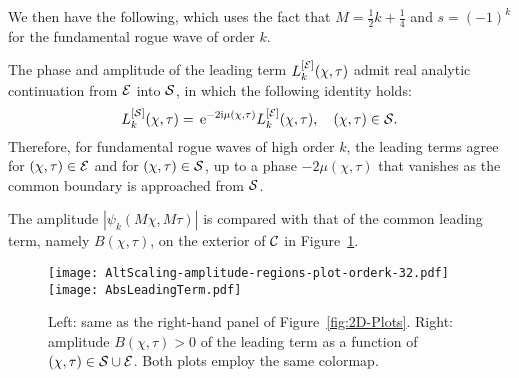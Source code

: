 We then have the following, which uses the fact that $M=\tfrac{1}{2}k+\tfrac{1}{4}$ and $s=(-1)^k$ for the fundamental rogue wave of order $k$.
\begin{corollary}
The phase and amplitude of the leading term $L_k^{[\mathcal{E}]}(\chi,\tau)$ admit real analytic continuation from $\mathcal{E}$ into $\mathcal{S}$, in which the following identity holds:
\begin{equation}
L_k^{[\mathcal{S}]}(\chi,\tau)=\,\mathrm{e}^{-2\mathrm{i}\mu(\chi,\tau)}L_k^{[\mathcal{E}]}(\chi,\tau),\quad (\chi,\tau)\in\mathcal{S}.
\end{equation}
Therefore, for fundamental rogue waves of high order $k$, the leading terms agree for $(\chi,\tau)\in\mathcal{E}$ and for $(\chi,\tau)\in\mathcal{S}$, up to a phase $-2\mu(\chi,\tau)$ that vanishes as the common boundary is approached from $\mathcal{S}$.
\label{cor:leading-term-match-shelves-exterior}
\end{corollary}
The amplitude $|\psi_k(M\chi,M\tau)|$ is compared with that of the common leading term, namely $B(\chi,\tau)$, on the exterior of $\mathcal{C}$ in Figure~\ref{fig:AbsLeadingTermShelves}.  
\begin{figure}[h]
\begin{center}
\phantom{!}\hfill\texttt{[image: AltScaling-amplitude-regions-plot-orderk-32.pdf]}\hfill%
\texttt{[image: AbsLeadingTerm.pdf]}\hfill\phantom{!}%
\end{center}
\caption{Left:  same as the right-hand panel of Figure~\ref{fig:2D-Plots}.  Right:  amplitude $B(\chi,\tau)>0$ of the leading term as a function of $(\chi,\tau)\in\mathcal{S}\cup\mathcal{E}$.  Both plots employ the same colormap.}
\label{fig:AbsLeadingTermShelves}
\end{figure}

